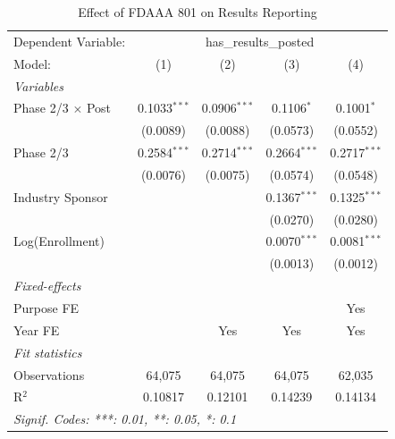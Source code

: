 
\begin{table}[htbp]
   \caption{\label{tab:main_did} Effect of FDAAA 801 on Results Reporting}
   \centering
   \begin{tabular}{lcccc}
      \tabularnewline \midrule \midrule
      Dependent Variable: & \multicolumn{4}{c}{has\_results\_posted}\\
      Model:                   & (1)            & (2)            & (3)            & (4)\\  
      \midrule
      \emph{Variables}\\
      Phase 2/3 $\times$ Post  & 0.1033$^{***}$ & 0.0906$^{***}$ & 0.1106$^{*}$   & 0.1001$^{*}$\\   
                               & (0.0089)       & (0.0088)       & (0.0573)       & (0.0552)\\   
      Phase 2/3                & 0.2584$^{***}$ & 0.2714$^{***}$ & 0.2664$^{***}$ & 0.2717$^{***}$\\   
                               & (0.0076)       & (0.0075)       & (0.0574)       & (0.0548)\\   
      Industry Sponsor         &                &                & 0.1367$^{***}$ & 0.1325$^{***}$\\   
                               &                &                & (0.0270)       & (0.0280)\\   
      Log(Enrollment)          &                &                & 0.0070$^{***}$ & 0.0081$^{***}$\\   
                               &                &                & (0.0013)       & (0.0012)\\   
      \midrule
      \emph{Fixed-effects}\\
      Purpose FE               &                &                &                & Yes\\  
      Year FE                  &                & Yes            & Yes            & Yes\\  
      \midrule
      \emph{Fit statistics}\\
      Observations             & 64,075         & 64,075         & 64,075         & 62,035\\  
      R$^2$                    & 0.10817        & 0.12101        & 0.14239        & 0.14134\\  
      \midrule \midrule
      \multicolumn{5}{l}{\emph{Signif. Codes: ***: 0.01, **: 0.05, *: 0.1}}\\
   \end{tabular}
\par{}
\end{table}
